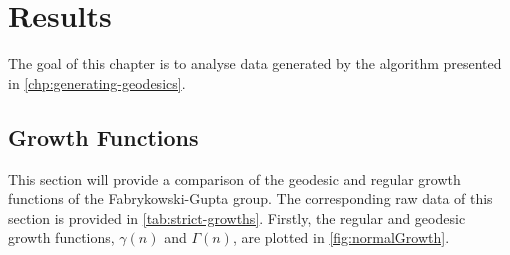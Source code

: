 \chapter{Results}

The goal of this chapter is to analyse data generated by the algorithm presented in \cref{chp:generating-geodesics}.

\section{Growth Functions}

This section will provide a comparison of the geodesic and regular growth functions of the Fabrykowski-Gupta group.
The corresponding raw data of this section is provided in \cref{tab:strict-growths}.
Firstly, the regular and geodesic growth functions, $\gamma(n)$ and $\Gamma(n)$, are plotted in \cref{fig:normalGrowth}.


